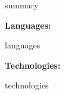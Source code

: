 \documentclass[9pt]{developercv} %
\begin{document}
\begin{minipage}[t]{0.46\textwidth}
	\vspace{-6pt}
 
{{summary}}

\end{minipage}
\hfill %
\begin{minipage}[t]{0.465\textwidth}
    \vspace{-6pt}
    
    \begin{minipage}[t]{0.2\textwidth}
        \textbf{Languages:}
    \end{minipage}
    \hfill
    \begin{minipage}[t]{0.73\textwidth}
      {{languages}}
    \end{minipage}
    \vspace{4mm}
    
    \begin{minipage}[t]{0.2\textwidth}
        \textbf{Technologies:}
    \end{minipage}
    \hfill
    \begin{minipage}[t]{0.73\textwidth}
       {{technologies}}
    \end{minipage}
    
\end{minipage}
\end{document}
